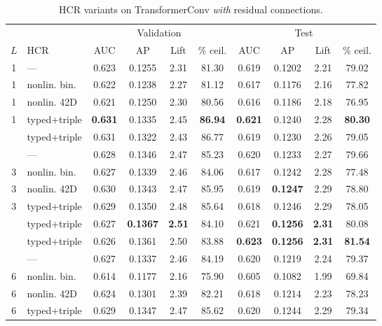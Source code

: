     \begin{table}[H]
      \centering
      \small
      \setlength{\tabcolsep}{4pt}
      \caption{HCR variants on TransformerConv \emph{with} residual connections.}
      \label{tab:hcr-res}
      \begin{tabular}{clcccccccc}
        \toprule
        & & \multicolumn{4}{c}{Validation} & \multicolumn{4}{c}{Test} \\
        \cmidrule(lr){3-6}\cmidrule(lr){7-10}
        $L$ & HCR & AUC & AP & Lift & \% ceil. & AUC & AP & Lift & \% ceil. \\
        \midrule
        1 & ---            & 0.623 & 0.1255 & 2.31 & 81.30 & 0.619 & 0.1202 & 2.21 & 79.02 \\
        1 & nonlin. bin.   & 0.622 & 0.1238 & 2.27 & 81.12 & 0.617 & 0.1176 & 2.16 & 77.82 \\
        1 & nonlin. 42D    & 0.621 & 0.1250 & 2.30 & 80.56 & 0.616 & 0.1186 & 2.18 & 76.95 \\
        1 & typed+triple   & \textbf{0.631} & 0.1335 & 2.45 & \textbf{86.94} & \textbf{0.621} & 0.1240 & 2.28 & \textbf{80.30} \\
        \addlinespace[4pt]
        2 & typed+triple   & 0.631 & 0.1322 & 2.43 & 86.77 & 0.619 & 0.1230 & 2.26 & 79.05 \\
        \addlinespace[4pt]
        3 & ---            & 0.628 & 0.1346 & 2.47 & 85.23 & 0.620 & 0.1233 & 2.27 & 79.66 \\
        3 & nonlin. bin.   & 0.627 & 0.1339 & 2.46 & 84.06 & 0.617 & 0.1242 & 2.28 & 77.48 \\
        3 & nonlin. 42D    & 0.630 & 0.1343 & 2.47 & 85.95 & 0.619 & \textbf{0.1247} & 2.29 & 78.80 \\
        3 & typed+triple   & 0.629 & 0.1350 & 2.48 & 85.64 & 0.618 & 0.1246 & 2.29 & 78.05 \\
        \addlinespace[4pt]
        4 & typed+triple   & 0.627 & \textbf{0.1367} & \textbf{2.51} & 84.10 & 0.621 & \textbf{0.1256} & \textbf{2.31} & 80.08 \\
        \addlinespace[4pt]
        5 & typed+triple   & 0.626 & 0.1361 & 2.50 & 83.88 & \textbf{0.623} & \textbf{0.1256} & \textbf{2.31} & \textbf{81.54} \\
        \addlinespace[4pt]
        6 & ---            & 0.627 & 0.1337 & 2.46 & 84.19 & 0.620 & 0.1219 & 2.24 & 79.37 \\
        6 & nonlin. bin.   & 0.614 & 0.1177 & 2.16 & 75.90 & 0.605 & 0.1082 & 1.99 & 69.84 \\
        6 & nonlin. 42D    & 0.624 & 0.1301 & 2.39 & 82.21 & 0.618 & 0.1214 & 2.23 & 78.23 \\
        6 & typed+triple   & 0.629 & 0.1347 & 2.47 & 85.62 & 0.620 & 0.1244 & 2.29 & 79.34 \\
        \bottomrule
      \end{tabular}
    \end{table}
    
